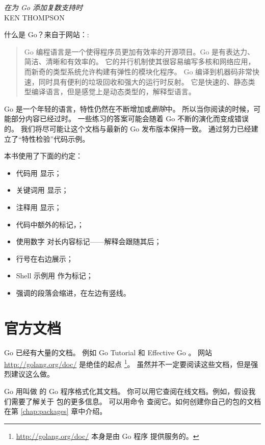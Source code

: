 {\textit{在为 Go 添加复数支持时}\\ \textsc{KEN THOMPSON}}

\noindent{}什么是 Go？来自于网站：\cite{go_web}:
\begin{quote}
Go 编程语言是一个使得程序员更加有效率的开源项目。Go 是有表达力、简洁、清晰和有效率的。
它的并行机制使其很容易编写多核和网络应用，而新奇的类型系统允许构建有弹性的模块化程序。
Go 编译到机器码非常快速，同时具有便利的垃圾回收和强大的运行时反射。
它是快速的、静态类型编译语言，但是感觉上是动态类型的，解释型语言。
\end{quote}

Go 是一个年轻的语言，特性仍然在不断增加或\emph{删除}中。
所以当你阅读的时候，可能部分内容已经过时。
一些练习的答案可能会随着 Go 不断的演化而变成错误的。
我们将尽可能让这个文档与最新的 Go 发布版本保持一致。
通过努力已经建立了“特性检验”代码示例。

本书使用了下面的约定：
\begin{itemize}
\item 代码用  显示；
\item 关键词用  显示；
\item 注释用  显示；
\item 代码中额外的标记，；
\item 使用数字  对长内容标记——解释会跟随其后；
\item 行号在右边展示；
\item Shell 示例用 \pr{} 作为标记；
\item 强调的段落会缩进，在左边有竖线。
\end{itemize}

\section{官方文档}
Go 已经有大量的文档。
例如 Go Tutorial \cite{go_tutorial} 和 Effective Go \cite{effective_go}。
网站 \url{http://golang.org/doc/} 是绝佳的起点 
\footnote{\url{http://golang.org/doc/} 本身是由 Go 程序  提供服务的。}。
虽然并不一定要阅读这些文档，但是强烈建议这么做。

Go 用叫做  的 Go 程序格式化其文档。
你可以用它查阅在线文档。例如，假设我们需要了解关于  包的更多信息。
可以用命令  查阅它。如何创建你自己的包的文档在第
\ref{chap:packages} 章中介绍。

